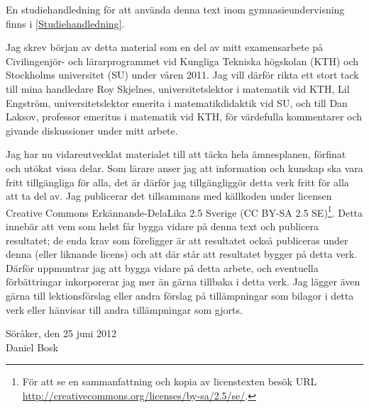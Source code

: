 En studiehandledning för att använda denna text inom gymnasieundervisning finns 
i \cref{Studiehandledning}.

Jag skrev början av detta material som en del av mitt examensarbete på
Civilingenjör- och lärarprogrammet vid Kungliga Tekniska högskolan (KTH) och
Stockholms universitet (SU) under våren 2011.
Jag vill därför rikta ett stort tack till mina handledare
Roy Skjelnes, universitetslektor i matematik vid KTH,
Lil Engström, universitetslektor emerita i matematikdidaktik vid SU, och
till Dan Laksov, professor emeritus i matematik vid KTH,
för värdefulla kommentarer och givande diskussioner under mitt arbete.

Jag har nu vidareutvecklat materialet till att täcka hela ämnesplanen, förfinat 
och utökat vissa delar.
Som lärare anser jag att information och kunskap ska vara fritt tillgängliga 
för alla, det är därför jag tillgängliggör detta verk fritt för alla att ta del 
av.
Jag publicerar det tillsammans med källkoden under licensen Creative Commons 
Erkännande-DelaLika 2.5 Sverige (CC BY-SA 2.5 SE)\footnote{%
  För att se en sammanfattning och kopia av licenstexten besök URL 
  \url{http://creativecommons.org/licenses/by-sa/2.5/se/}.
}.
Detta innebär att vem som helst får bygga vidare på denna text och publicera 
resultatet; de enda krav som föreligger är att resultatet också publiceras 
under denna (eller liknande licens) och att där står att resultatet bygger på 
detta verk.
Därför uppmuntrar jag att bygga vidare på detta arbete, och eventuella 
förbättringar inkorporerar jag mer än gärna tillbaka i detta verk.
Jag lägger även gärna till lektionsförslag eller andra förslag på tillämpningar 
som bilagor i detta verk eller hänvisar till andra tillämpningar som gjorts.

\vspace{2cm}
\begin{flushright}
  \parbox{0.5\textwidth}{%
    Söråker, den 25 juni 2012\\
    \vspace{10pt}%
    Daniel Bosk
  }
\end{flushright}

